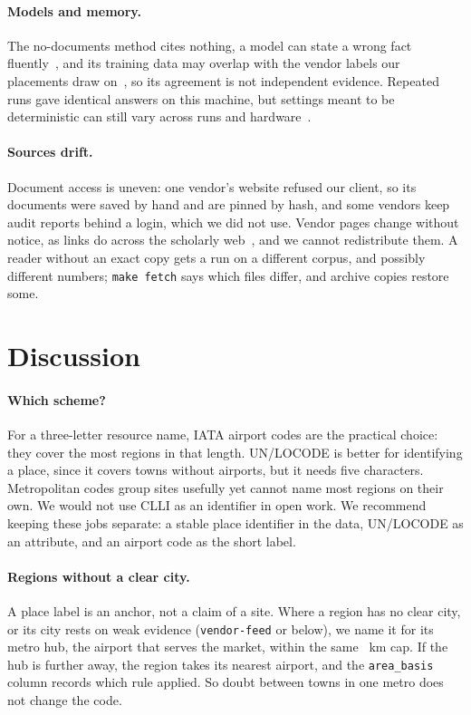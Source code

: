 \documentclass[10pt,twocolumn]{article}
\newcommand{\code}[1]{\texttt{#1}}
\begin{document}
\paragraph{Models and memory.} The no-documents method cites nothing, a model can state a wrong fact fluently~\citep{ji2023survey}, and its training data may overlap with the vendor labels our placements draw on~\citep{sainz2023nlp}, so its agreement is not independent evidence. Repeated runs gave identical answers on this machine, but settings meant to be deterministic can still vary across runs and hardware~\citep{atil2024nondeterminism}.

\paragraph{Sources drift.} Document access is uneven: one vendor's website refused our client, so its documents were saved by hand and are pinned by hash, and some vendors keep audit reports behind a login, which we did not use. Vendor pages change without notice, as links do across the scholarly web~\citep{klein2014scholarly,jones2016scholarly}, and we cannot redistribute them. A reader without an exact copy gets a run on a different corpus, and possibly different numbers; \code{make fetch} says which files differ, and archive copies restore some.

\section{Discussion}

\paragraph{Which scheme?} For a three-letter resource name, IATA airport codes are the practical choice: they cover the most regions in that length. UN/LOCODE is better for identifying a place, since it covers towns without airports, but it needs five characters. Metropolitan codes group sites usefully yet cannot name most regions on their own. We would not use CLLI as an identifier in open work. We recommend keeping these jobs separate: a stable place identifier in the data, UN/LOCODE as an attribute, and an airport code as the short label.

\paragraph{Regions without a clear city.} A place label is an anchor, not a claim of a site. Where a region has no clear city, or its city rests on weak evidence (\code{vendor-feed} or below), we name it for its metro hub, the airport that serves the market, within the same \capUsed{}~km cap. If the hub is further away, the region takes its nearest airport, and the \code{area\_basis} column records which rule applied. So doubt between towns in one metro does not change the code.
\end{document}

